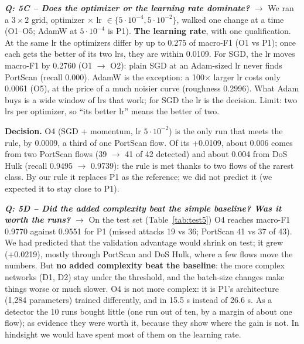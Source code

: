 \documentclass[9pt]{extarticle}
\newcommand{\Q}[1]{\textbf{\emph{Q: #1}}}
\newcommand{\run}[1]{\textsf{#1}}
\begin{document}
\Q{5C -- Does the optimizer or the learning rate dominate?} $\rightarrow$ We ran a $3\times2$ grid, optimizer $\times$ lr $\in\{5\cdot10^{-4}, 5\cdot10^{-2}\}$, walked one change at a time (\run{O1}--\run{O5}; AdamW at $5\cdot10^{-4}$ is \run{P1}). \textbf{The learning rate}, with one qualification. At the same lr the optimizers differ by up to 0.275 of macro-F1 (\run{O1} vs \run{P1}); once each gets the better of its two lrs, they are within 0.0109. For SGD, the lr moves macro-F1 by 0.2760 (\run{O1} $\rightarrow$ \run{O2}): plain SGD at an Adam-sized lr never finds PortScan (recall 0.000). AdamW is the exception: a 100$\times$ larger lr costs only 0.0061 (\run{O5}), at the price of a much noisier curve (roughness 0.2996). What Adam buys is a wide window of lrs that work; for SGD the lr is the decision. Limit: two lrs per optimizer, so ``its better lr'' means the better of two.

\textbf{Decision.} \run{O4} (SGD + momentum, lr $5\cdot10^{-2}$) is the only run that meets the rule, by 0.0009, a third of one PortScan flow. Of its +0.0109, about 0.006 comes from two PortScan flows (39 $\rightarrow$ 41 of 42 detected) and about 0.004 from DoS Hulk (recall 0.9495 $\rightarrow$ 0.9739): the rule is met thanks to two flows of the rarest class. By our rule it replaces \run{P1} as the reference; we did not predict it (we expected it to stay close to \run{P1}).

\Q{5D -- Did the added complexity beat the simple baseline? Was it worth the runs?} $\rightarrow$ On the test set (Table~\ref{tab:test5}) \run{O4} reaches macro-F1 0.9770 against 0.9551 for \run{P1} (missed attacks 19 vs 36; PortScan 41 vs 37 of 43). We had predicted that the validation advantage would shrink on test; it grew (+0.0219), mostly through PortScan and DoS Hulk, where a few flows move the numbers. But \textbf{no added complexity beat the baseline}: the more complex networks (\run{D1}, \run{D2}) stay under the threshold, and the batch-size changes make things worse or much slower. \run{O4} is not more complex: it is \run{P1}'s architecture (1,284 parameters) trained differently, and in 15.5 s instead of 26.6 s. As a detector the 10 runs bought little (one run out of ten, by a margin of about one flow); as evidence they were worth it, because they show where the gain is not. In hindsight we would have spent most of them on the learning rate.
\end{document}
